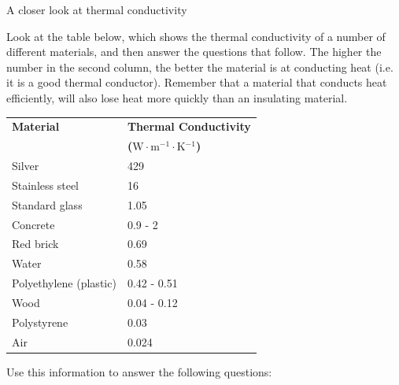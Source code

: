             \begin{Investigation}{A closer look at thermal conductivity}
{            \nopagebreak
      \label{m38706*id66744}Look at the table below, which shows the thermal conductivity of a number of different materials, and then answer the questions that follow. The higher the number in the second column, the better the material is at conducting heat (i.e. it is a good thermal conductor). Remember that a material that conducts heat efficiently, will also lose heat more quickly than an insulating material.\par 
          \begin{table}[H]
        \begin{center}
      \label{m38706*id66753}
    \noindent
      \begin{tabular}{|l|l|}\hline
\textbf{Material} & \textbf{Thermal Conductivity} \\ 
                 &  \textbf{($\text{W}\ensuremath{\cdot}\text{m}{}^{-1}\ensuremath{\cdot}\text{K}{}^{-1}$) } \\ \hline
Silver & 429 \\ \hline
Stainless steel & 16 \\ \hline
Standard glass & 1.05 \\ \hline
Concrete & 0.9 - 2 \\ \hline
Red brick & 0.69 \\ \hline
Water & 0.58 \\ \hline
Polyethylene (plastic) & 0.42 - 0.51 \\ \hline
Wood & 0.04 - 0.12 \\ \hline
Polystyrene & 0.03 \\ \hline
Air & 0.024 \\ \hline
    \end{tabular}
      \end{center}
\end{table}
    \par
      \label{m38706*id67009}Use this information to answer the following questions:\par 
}
\end{Investigation}
